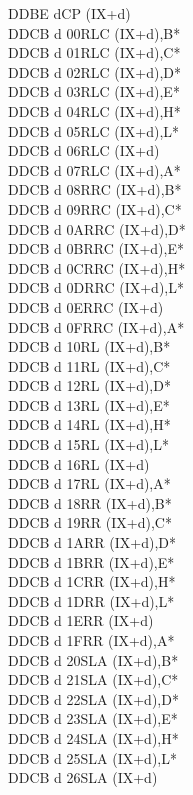 \documentclass[oneside,a4paper]{book}
\begin{document}
\begin{multicols}{3}
{\begin{tabbing}
DDBE d\>CP (IX+d)\\
DDCB d 00\>RLC (IX+d),B*\\
DDCB d 01\>RLC (IX+d),C*\\
DDCB d 02\>RLC (IX+d),D*\\
DDCB d 03\>RLC (IX+d),E*\\
DDCB d 04\>RLC (IX+d),H*\\
DDCB d 05\>RLC (IX+d),L*\\
DDCB d 06\>RLC (IX+d)\\
DDCB d 07\>RLC (IX+d),A*\\
DDCB d 08\>RRC (IX+d),B*\\
DDCB d 09\>RRC (IX+d),C*\\
DDCB d 0A\>RRC (IX+d),D*\\
DDCB d 0B\>RRC (IX+d),E*\\
DDCB d 0C\>RRC (IX+d),H*\\
DDCB d 0D\>RRC (IX+d),L*\\
DDCB d 0E\>RRC (IX+d)\\
DDCB d 0F\>RRC (IX+d),A*\\
DDCB d 10\>RL (IX+d),B*\\
DDCB d 11\>RL (IX+d),C*\\
DDCB d 12\>RL (IX+d),D*\\
DDCB d 13\>RL (IX+d),E*\\
DDCB d 14\>RL (IX+d),H*\\
DDCB d 15\>RL (IX+d),L*\\
DDCB d 16\>RL (IX+d)\\
DDCB d 17\>RL (IX+d),A*\\
DDCB d 18\>RR (IX+d),B*\\
DDCB d 19\>RR (IX+d),C*\\
DDCB d 1A\>RR (IX+d),D*\\
DDCB d 1B\>RR (IX+d),E*\\
DDCB d 1C\>RR (IX+d),H*\\
DDCB d 1D\>RR (IX+d),L*\\
DDCB d 1E\>RR (IX+d)\\
DDCB d 1F\>RR (IX+d),A*\\
DDCB d 20\>SLA (IX+d),B*\\
DDCB d 21\>SLA (IX+d),C*\\
DDCB d 22\>SLA (IX+d),D*\\
DDCB d 23\>SLA (IX+d),E*\\
DDCB d 24\>SLA (IX+d),H*\\
DDCB d 25\>SLA (IX+d),L*\\
DDCB d 26\>SLA (IX+d)\\

\end{tabbing}}
\end{multicols}
\end{document}
